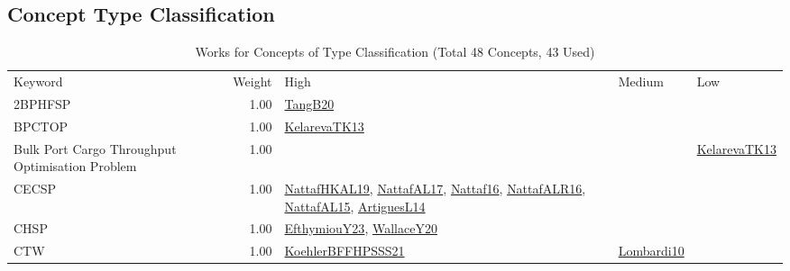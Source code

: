 \subsection{Concept Type Classification}
\label{sec:Classification}
\label{Classification}
{\scriptsize
\begin{longtable}{p{3cm}r>{\raggedright\arraybackslash}p{6cm}>{\raggedright\arraybackslash}p{6cm}>{\raggedright\arraybackslash}p{8cm}}
\rowcolor{white}\caption{Works for Concepts of Type Classification (Total 48 Concepts, 43 Used)}\\ \toprule
\rowcolor{white}Keyword & Weight & High & Medium & Low\\ \midrule\endhead
\bottomrule
\endfoot
\index{2BPHFSP}\index{Classification!2BPHFSP}2BPHFSP &  1.00 & \hyperref[detail:TangB20]{TangB20} &  & \\
\index{BPCTOP}\index{Classification!BPCTOP}BPCTOP &  1.00 & \hyperref[detail:KelarevaTK13]{KelarevaTK13} &  & \\
\index{Bulk Port Cargo Throughput Optimisation Problem}\index{Classification!Bulk Port Cargo Throughput Optimisation Problem}Bulk Port Cargo Throughput Optimisation Problem &  1.00 &  &  & \hyperref[detail:KelarevaTK13]{KelarevaTK13}\\
\index{CECSP}\index{Classification!CECSP}CECSP &  1.00 & \hyperref[detail:NattafHKAL19]{NattafHKAL19}, \hyperref[detail:NattafAL17]{NattafAL17}, \hyperref[detail:Nattaf16]{Nattaf16}, \hyperref[detail:NattafALR16]{NattafALR16}, \hyperref[detail:NattafAL15]{NattafAL15}, \hyperref[detail:ArtiguesL14]{ArtiguesL14} &  & \\
\index{CHSP}\index{Classification!CHSP}CHSP &  1.00 & \hyperref[detail:EfthymiouY23]{EfthymiouY23}, \hyperref[detail:WallaceY20]{WallaceY20} &  & \\
\index{CTW}\index{Classification!CTW}CTW &  1.00 & \hyperref[detail:KoehlerBFFHPSSS21]{KoehlerBFFHPSSS21} & \hyperref[detail:Lombardi10]{Lombardi10} & \\

\end{longtable}}
